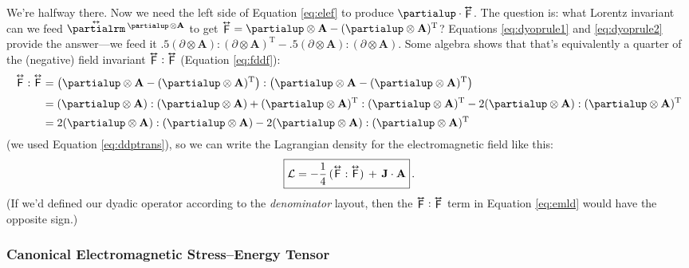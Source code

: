 \documentclass[12pt]{article}
\renewcommand{\vv}[1]{\mathbf{#1}}
\newcommand{\tightoverset}[2]{%
  \mathop{#2}\limits^{\vbox to -.5ex{\kern-0.75ex\hbox{$#1$}\vss}}}
\newcommand{\inlinedy}[1]{\tightoverset{\text{\tiny$\bm\leftrightarrow$}}{#1}}
\newcommand{\capdy}[1]{ \overset{ \text{\tiny$\bm\leftrightarrow$} }{\vphantom{\text{\small{A}}}\smash{#1}} }
\begin{document}
We're halfway there. Now we need the left side of Equation \ref{eq:elef} to produce $\partialup \cdot \inlinedy{\mathsf{F}}$. The question is: what Lorentz invariant can we feed $\inlinedy{\partialrm} {}^{\partialup \mkern2mu \otimes \vv A}$ to get $\inlinedy{\mathsf{F}} = \partialup \otimes \vv A - (\partialup \otimes \vv A)^\mathrm{T}$? Equations \ref{eq:dyoprule1} and \ref{eq:dyoprule2} provide the answer---we feed it $ .5(\partialup \otimes \vv A):(\partialup \otimes \vv A)^\mathrm{T} - .5(\partialup \otimes \vv A):(\partialup \otimes \vv A) $. Some algebra shows that that's equivalently a quarter of the (negative) field invariant $ \inlinedy{\mathsf{F}} : \inlinedy{\mathsf{F}} $ (Equation \ref{eq:fddf}):
\begin{equation*}
\begin{aligned}
\capdy{\mathsf{F}} : \capdy{\mathsf{F}} &= \left( \partialup \otimes \vv A - (\partialup \otimes \vv A)^\mathrm{T} \right) : \left( \partialup \otimes \vv A - (\partialup \otimes \vv A)^\mathrm{T} \right) \\[2pt]
&= (\partialup \otimes \vv A):(\partialup \otimes \vv A) + (\partialup \otimes \vv A)^\mathrm{T} : (\partialup \otimes \vv A)^\mathrm{T}  - 2 (\partialup \otimes \vv A):(\partialup \otimes \vv A)^\mathrm{T} \\[2pt]
&= 2 (\partialup \otimes \vv A):(\partialup \otimes \vv A) - 2 (\partialup \otimes \vv A):(\partialup \otimes \vv A)^\mathrm{T}
\end{aligned}
\end{equation*}
(we used Equation \ref{eq:ddptrans}), so we can write the Lagrangian density for the electromagnetic field like this:
\begin{equation}\label{eq:emld}
\boxed{\mathcal{L} = - \dfrac{1}{4} \, ( \capdy{\mathsf{F}} : \capdy{\mathsf{F}} ) \, + \, \vv J \cdot \vv A} \, .
\end{equation}
(If we'd defined our dyadic operator according to the \emph{denominator} layout, then the $\inlinedy{\mathsf{F}} : \inlinedy{\mathsf{F}}$ term in Equation \ref{eq:emld} would have the opposite sign.)

\subsubsection{Canonical Electromagnetic Stress--Energy Tensor}
\end{document}
